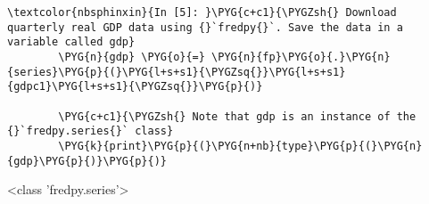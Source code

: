\documentclass[letterpaper,10pt,openany,oneside,english]{sphinxmanual}
\begin{document}
%
\begin{Verbatim}[commandchars=\\\{\}]
\textcolor{nbsphinxin}{In [5]: }\PYG{c+c1}{\PYGZsh{} Download quarterly real GDP data using {}`fredpy{}`. Save the data in a variable called gdp}
        \PYG{n}{gdp} \PYG{o}{=} \PYG{n}{fp}\PYG{o}{.}\PYG{n}{series}\PYG{p}{(}\PYG{l+s+s1}{\PYGZsq{}}\PYG{l+s+s1}{gdpc1}\PYG{l+s+s1}{\PYGZsq{}}\PYG{p}{)}
        
        \PYG{c+c1}{\PYGZsh{} Note that gdp is an instance of the {}`fredpy.series{}` class}
        \PYG{k}{print}\PYG{p}{(}\PYG{n+nb}{type}\PYG{p}{(}\PYG{n}{gdp}\PYG{p}{)}\PYG{p}{)}
\end{Verbatim}



%
\begin{OriginalVerbatim}[commandchars=\\\{\}]
<class 'fredpy.series'>
\end{OriginalVerbatim}
\relax
\end{document}
